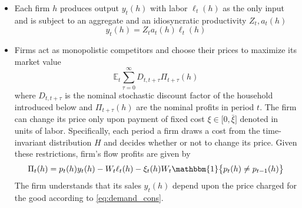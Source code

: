 \documentclass[a4paper,10pt]{article}  %
\begin{document}
\begin{itemize}[label=\raisebox{0.50ex}{\tiny$\bullet$}]
   \item Each firm $h$ produces output $y_t(h)$ with labor $\ell_t(h)$ as the only input and is subject to an aggregate
   and an idiosyncratic productivity $ Z_t,a_t(h) $
   \begin{equation}
      \label{eq:model_eq1}
      y_t(h) = Z_t a_t(h) \ell_t(h)
   \end{equation}

   \item Firms act as monopolistic competitors and choose their prices to maximize its market value
   \begin{equation}
      \label{eq:model_eq}
      \mathbb{E}_t \sum_{\tau=0}^{\infty} D_{t,t+\tau} \Pi_{t+\tau} (h)
   \end{equation}
   where $D_{t,t+\tau}$ is the nominal stochastic discount factor of the household introduced below and $\Pi_{t+\tau}
   (h) $ are the nominal profits in period $ t $. The firm can change its price only upon payment of fixed cost $ \xi
   \in \big[ 0, \bar{\xi} \big] $ denoted in units of labor. Specifically, each period a firm draws a cost from the
   time-invariant distribution $ H $ and decides whether or not to change its price. Given these restrictions, firm's
   flow profits are given by
   \begin{equation}
      \label{eq:model_eq3}
      \Pi_t(h) = p_t(h) y_t(h) - W_t \ell_t(h) - \xi_t(h) W_t \mathbbm{1} \big\{p_t(h) \ne p_{t-1}(h) \big\}
   \end{equation}
   The firm understands that its sales $ y_t(h) $ depend upon the price charged for the good according to \eqref{eq:demand_cons}. 

\end{itemize}

\end{document}
